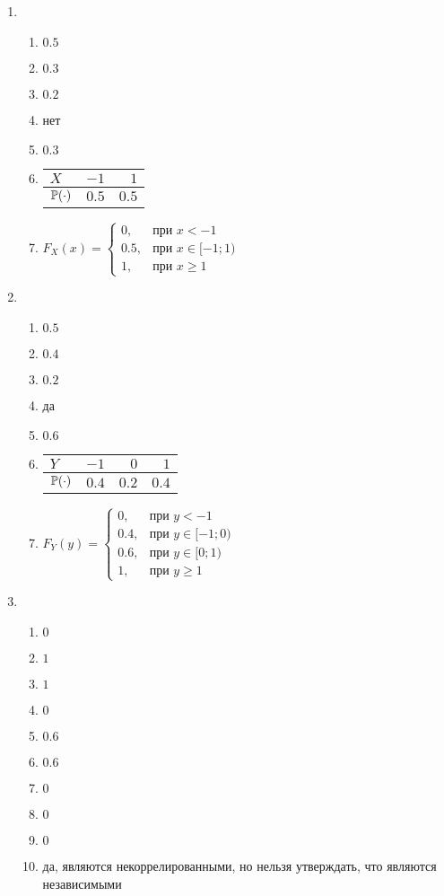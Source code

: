 \begin{multicols}{2}
\begin{enumerate}

\item
\begin{enumerate}
\item   $0.5 $
\item   $0.3$
\item   $0.2$
\item   нет
\item   $0.3$
\item
\begin{tabular}{lrr}
\toprule
$X$ & $-1$  & $1$   \\ \midrule
$\P(\cdot)$ & $0.5$ & $0.5$ \\ \bottomrule
\end{tabular}
\item  $F_{X}(x) = \begin{cases}
0, & \text{при } x < -1 \\
0.5 , & \text{при } x \in [-1;1) \\
1, & \text{при }  x \geq 1
\end{cases}$
\end{enumerate}
\item
\begin{enumerate}
\item   $0.5$
\item   $0.4$
\item   $0.2$
\item   да
\item   $0.6$
\item
\begin{tabular}{lrrr}
\toprule
$Y$ & $-1$  & $0$   & $1$   \\ \midrule
$\P(\cdot)$ & $0.4$ & $0.2$ & $0.4$ \\ \bottomrule
\end{tabular}
\item   $F_{Y}(y) = \begin{cases}
0, & \text{при } y < -1 \\
0.4 , & \text{при } y \in [-1;0) \\
0.6, & \text{при }  y \in [0;1)\\
1, & \text{при } y \geq 1
\end{cases}$
\end{enumerate}

\item
\begin{enumerate}
\item $0$
\item $1$
\item $1$
\item $0$
\item $0.6$
\item $0.6$
\item $0$
\item $0$
\item $0$
\item да, являются некоррелированными, но нельзя утверждать, что являются независимыми
\end{enumerate}


\end{enumerate}
\end{multicols}
